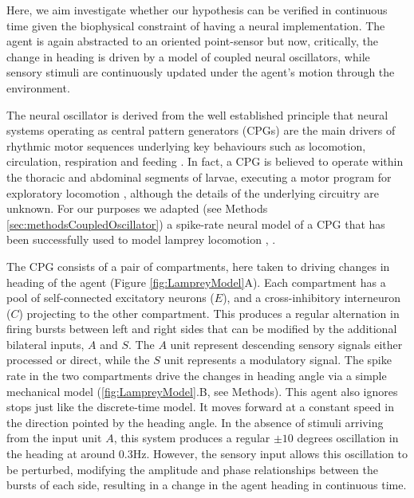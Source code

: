\documentclass[11pt,a4paper]{article}
\begin{document}
Here, we aim investigate whether our hypothesis can be verified in continuous time given the biophysical constraint of having a neural implementation.
The agent is again abstracted to an oriented point-sensor but now, critically, the change in heading is driven by a model of coupled neural oscillators, while sensory stimuli are continuously updated under the agent's motion through the environment.



 The neural oscillator is derived from the well established principle that neural systems operating as central pattern generators (CPGs) are the main drivers of rhythmic motor sequences underlying key behaviours such as locomotion, circulation, respiration and feeding \citep{delcomyn1980neural}.
In fact, a CPG is believed to operate  within the thoracic and abdominal segments of larvae, executing a motor program for exploratory locomotion \citep{hughes2007sensory,berni2012autonomous,lemon2015whole}, although the details of the underlying circuitry are unknown.
For our purposes we adapted (see Methods \ref{sec:methodsCoupledOscillator}) a spike-rate neural model of a CPG that has been successfully used to model lamprey locomotion \citep{cohen1992modelling,lansner1997realistic}, \cite[see][]{marder1996principles}.

The CPG consists of a pair of compartments, here taken to driving changes in heading of the agent (Figure \ref{fig:LampreyModel}A). 
Each compartment has a pool of self-connected excitatory neurons ($E$), and a cross-inhibitory interneuron ($C$) projecting to the other compartment.
  This produces a regular alternation in firing bursts between left and right sides that can be modified by the additional bilateral inputs, $A$ and $S$. The $A$ unit represent descending sensory signals either processed or direct, while the $S$ unit represents a modulatory signal.
 The spike rate in the two compartments drive the changes in heading angle via a simple mechanical model (\ref{fig:LampreyModel}.B, see Methods).
  This agent also ignores stops just like the discrete-time model.
   It moves forward at a constant speed in the direction pointed by the heading angle. In the absence of stimuli arriving from the input unit $A$, this system produces a regular $\pm 10$ degrees oscillation in the heading at around 0.3Hz.
    However, the sensory input allows this oscillation to be perturbed, modifying  the amplitude and phase relationships between the bursts of each side, resulting in a change in the agent heading in continuous time.
\end{document}
